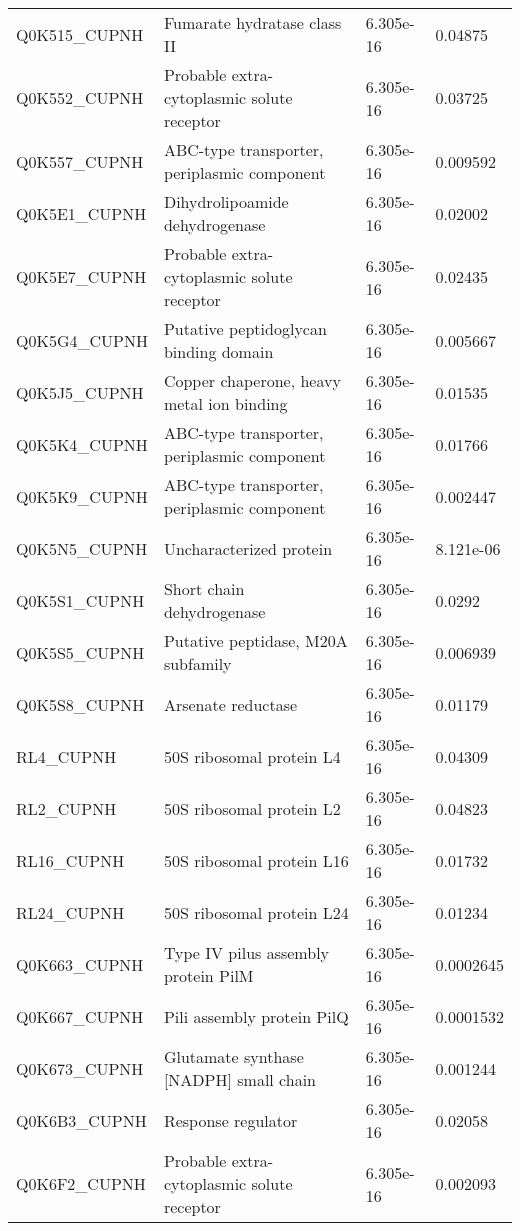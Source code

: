 \begin{center}
\begin{longtable}{ l l l l }
Q0K515\_CUPNH & Fumarate hydratase class II& 6.305e-16 & 0.04875 \\ [0.5ex]
Q0K552\_CUPNH & Probable extra-cytoplasmic solute receptor& 6.305e-16 & 0.03725 \\ [0.5ex]
Q0K557\_CUPNH & ABC-type transporter, periplasmic component& 6.305e-16 & 0.009592 \\ [0.5ex]
Q0K5E1\_CUPNH & Dihydrolipoamide dehydrogenase& 6.305e-16 & 0.02002 \\ [0.5ex]
Q0K5E7\_CUPNH & Probable extra-cytoplasmic solute receptor & 6.305e-16 & 0.02435 \\ [0.5ex]
Q0K5G4\_CUPNH & Putative peptidoglycan binding domain& 6.305e-16 & 0.005667 \\ [0.5ex]
Q0K5J5\_CUPNH & Copper chaperone, heavy metal ion binding& 6.305e-16 & 0.01535 \\ [0.5ex]
Q0K5K4\_CUPNH & ABC-type transporter, periplasmic component& 6.305e-16 & 0.01766 \\ [0.5ex]
Q0K5K9\_CUPNH & ABC-type transporter, periplasmic component& 6.305e-16 & 0.002447 \\ [0.5ex]
Q0K5N5\_CUPNH & Uncharacterized protein& 6.305e-16 & 8.121e-06 \\ [0.5ex]
Q0K5S1\_CUPNH & Short chain dehydrogenase& 6.305e-16 & 0.0292 \\ [0.5ex]
Q0K5S5\_CUPNH & Putative peptidase, M20A subfamily& 6.305e-16 & 0.006939 \\ [0.5ex]
Q0K5S8\_CUPNH & Arsenate reductase& 6.305e-16 & 0.01179 \\ [0.5ex]
RL4\_CUPNH & 50S ribosomal protein L4& 6.305e-16 & 0.04309 \\ [0.5ex]
RL2\_CUPNH & 50S ribosomal protein L2& 6.305e-16 & 0.04823 \\ [0.5ex]
RL16\_CUPNH & 50S ribosomal protein L16& 6.305e-16 & 0.01732 \\ [0.5ex]
RL24\_CUPNH & 50S ribosomal protein L24& 6.305e-16 & 0.01234 \\ [0.5ex]
Q0K663\_CUPNH & Type IV pilus assembly protein PilM& 6.305e-16 & 0.0002645 \\ [0.5ex]
Q0K667\_CUPNH & Pili assembly protein PilQ& 6.305e-16 & 0.0001532 \\ [0.5ex]
Q0K673\_CUPNH & Glutamate synthase [NADPH] small chain& 6.305e-16 & 0.001244 \\ [0.5ex]
Q0K6B3\_CUPNH & Response regulator & 6.305e-16 & 0.02058 \\ [0.5ex]
Q0K6F2\_CUPNH & Probable extra-cytoplasmic solute receptor& 6.305e-16 & 0.002093 \\ [0.5ex]

\end{longtable}
\end{center}
